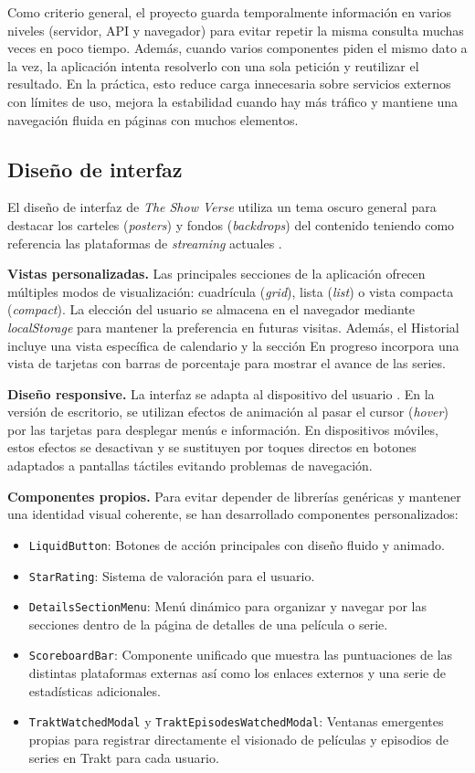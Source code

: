 Como criterio general, el proyecto guarda temporalmente información en varios niveles (servidor, API y navegador) para evitar repetir la misma consulta muchas veces en poco tiempo. Además, cuando varios componentes piden el mismo dato a la vez, la aplicación intenta resolverlo con una sola petición y reutilizar el resultado. En la práctica, esto reduce carga innecesaria sobre servicios externos con límites de uso, mejora la estabilidad cuando hay más tráfico y mantiene una navegación fluida en páginas con muchos elementos.

\subsection{Diseño de interfaz}

El diseño de interfaz de \textit{The Show Verse} utiliza un tema oscuro general para destacar los carteles (\textit{posters}) y fondos (\textit{backdrops}) del contenido teniendo como referencia las plataformas de \textit{streaming} actuales \parencite{Babich:2021,Nielsen:2024}.

\textbf{Vistas personalizadas.} 
Las principales secciones de la aplicación ofrecen múltiples modos de visualización: cuadrícula (\textit{grid}), lista (\textit{list}) o vista compacta (\textit{compact}). La elección del usuario se almacena en el navegador mediante \textit{localStorage} para mantener la preferencia en futuras visitas. Además, el Historial incluye una vista específica de calendario y la sección En progreso incorpora una vista de tarjetas con barras de porcentaje para mostrar el avance de las series.

\textbf{Diseño responsive.} 
La interfaz se adapta al dispositivo del usuario \parencite{MDN:2024d}. En la versión de escritorio, se utilizan efectos de animación al pasar el cursor (\textit{hover}) por las tarjetas para desplegar menús e información. En dispositivos móviles, estos efectos se desactivan y se sustituyen por toques directos en botones adaptados a pantallas táctiles evitando problemas de navegación.

\textbf{Componentes propios.} 
Para evitar depender de librerías genéricas y mantener una identidad visual coherente, se han desarrollado componentes personalizados:
\begin{itemize}
    \item \texttt{LiquidButton}: Botones de acción principales con diseño fluido y animado.
    \item \texttt{StarRating}: Sistema de valoración para el usuario.
    \item \texttt{DetailsSectionMenu}: Menú dinámico para organizar y navegar por las secciones dentro de la página de detalles de una película o serie.
    \item \texttt{ScoreboardBar}: Componente unificado que muestra las puntuaciones de las distintas plataformas externas así como los enlaces externos y una serie de estadísticas adicionales.
    \item \texttt{TraktWatchedModal} y \texttt{TraktEpisodesWatchedModal}: Ventanas emergentes propias para registrar directamente el visionado de películas y episodios de series en Trakt para cada usuario.
\end{itemize}

